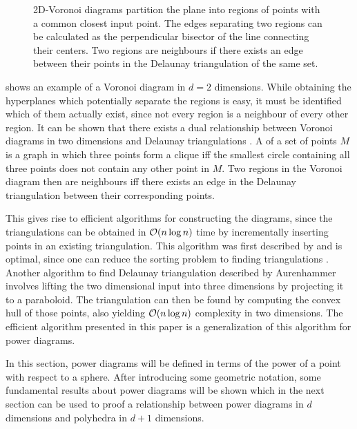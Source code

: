 \begin{figure}[tb]
    \caption{2D-Voronoi diagrams partition the plane into regions of points with a common closest input point. The edges separating two regions can be calculated as the perpendicular bisector of the line connecting their centers. Two regions are neighbours if there exists an edge between their points in the Delaunay triangulation of the same set.}
    \label{fig:voronoi}
\end{figure}

 shows an example of a Voronoi diagram in $d = 2$ dimensions.
While obtaining the hyperplanes which potentially separate the regions is easy, it must be identified which of them actually exist, since not every region is a neighbour of every other region.
It can be shown that there exists a dual relationship between Voronoi diagrams in two dimensions and Delaunay triangulations \cite{aurenhammer1991voronoi}.
A  of a set of points $M$ is a graph in which three points form a clique iff the smallest circle containing all three points does not contain any other point in $M$.
Two regions in the Voronoi diagram then are neighbours iff there exists an edge in the Delaunay triangulation between their corresponding points.

This gives rise to efficient algorithms for constructing the diagrams, since the triangulations can be obtained in $\mathcal{O}(n \log n)$ time by incrementally inserting points in an existing triangulation.
This algorithm was first described by \textcite{green1978computing} and is optimal, since one can reduce the sorting problem to finding triangulations \cite{aurenhammer1991voronoi}.
Another algorithm to find Delaunay triangulation described by Aurenhammer involves lifting the two dimensional input into three dimensions by projecting it to a paraboloid.
The triangulation can then be found by computing the convex hull of those points, also yielding $\mathcal{O}(n \log n)$ complexity in two dimensions.
The efficient algorithm presented in this paper is a generalization of this algorithm for power diagrams.

In this section, power diagrams will be defined in terms of the power of a point with respect to a sphere.
After introducing some geometric notation, some fundamental results about power diagrams will be shown which in the next section can be used to proof a relationship between power diagrams in $d$ dimensions and polyhedra in $d + 1$ dimensions.

